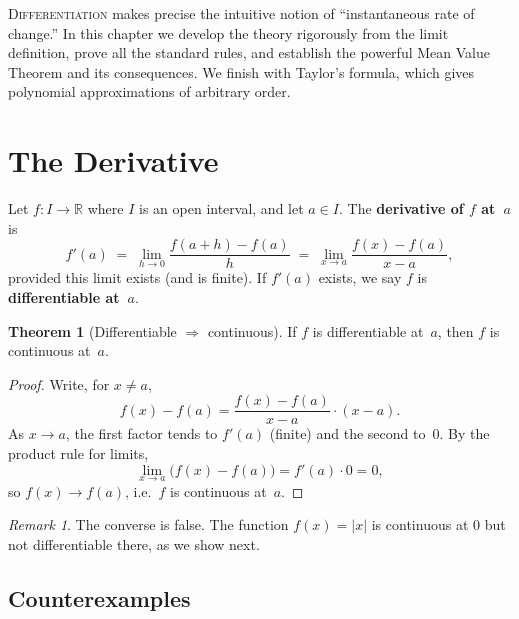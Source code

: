 \documentclass[12pt,a4paper,openany]{book}
\theoremstyle{definition}
\newtheorem{theorem}{Theorem}[chapter]
\theoremstyle{remark}
\newtheorem{remark}{Remark}[chapter]
\begin{document}
\minitoc\bigskip

\lettrine[lines=3,lhang=0.15]{D}{ifferentiation} makes precise the
intuitive notion of ``instantaneous rate of change.''  In this chapter
we develop the theory rigorously from the limit definition, prove
all the standard rules, and establish the powerful Mean Value Theorem
and its consequences.  We finish with Taylor's formula, which gives
polynomial approximations of arbitrary order.

\section{The Derivative}

\begin{tcolorbox}[colback=blue!3,colframe=blue!50!black,
  title={Definition of the derivative},fonttitle=\bfseries]
Let $f\colon I\to\mathbb{R}$ where $I$ is an open interval, and let
$a\in I$.  The \textbf{derivative of $f$ at~$a$} is
\[
  f'(a) \;=\; \lim_{h\to 0}\frac{f(a+h)-f(a)}{h}
  \;=\; \lim_{x\to a}\frac{f(x)-f(a)}{x-a},
\]
provided this limit exists (and is finite).  If $f'(a)$ exists, we
say $f$ is \textbf{differentiable at~$a$}.
\end{tcolorbox}

\begin{theorem}[Differentiable $\Rightarrow$ continuous]
\label{thm:diff-implies-cont}
If $f$ is differentiable at~$a$, then $f$ is continuous at~$a$.
\end{theorem}

\begin{proof}
Write, for $x\neq a$,
\[
  f(x)-f(a) = \frac{f(x)-f(a)}{x-a}\cdot(x-a).
\]
As $x\to a$, the first factor tends to $f'(a)$ (finite) and the second
to~$0$.  By the product rule for limits,
\[
  \lim_{x\to a}\bigl(f(x)-f(a)\bigr) = f'(a)\cdot 0 = 0,
\]
so $f(x)\to f(a)$, i.e.\ $f$ is continuous at~$a$.
\end{proof}

\begin{remark}
The converse is false.  The function $f(x)=|x|$ is continuous at $0$
but not differentiable there, as we show next.
\end{remark}

\subsection{Counterexamples}
\end{document}
